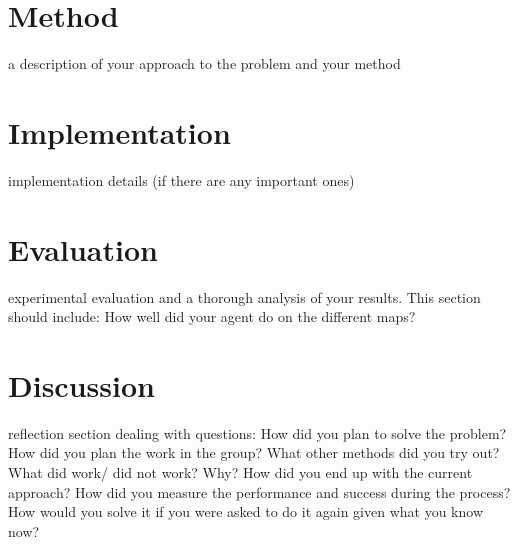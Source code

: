 \documentclass[a4paper,11pt]{article}
\begin{document}
\section{Method}
a description of your approach to the problem and your method
\section{Implementation}
implementation details (if there are any important ones)
\section{Evaluation}
experimental evaluation and a thorough analysis of your results. This section should include:
How well did your agent do on the different maps?
\section{Discussion}
reflection section dealing with questions: How did you plan to solve the problem? How did you plan the work in the group? What other methods did you try out? What did work/ did not work? Why? How did you end up with the current approach? How did you measure the performance and success during the process? How would you solve it if you were asked to do it again given what you know now?

\printbibliography
\end{document}

